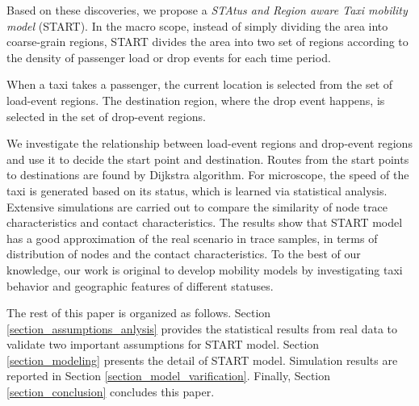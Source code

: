 Based on these discoveries, we propose a \emph{STAtus and Region aware Taxi mobility model} (START). In the macro scope, instead of simply dividing the area into coarse-grain regions, START divides the area into two set of regions according to the density of passenger load or drop events for each time period.


When a taxi takes a passenger, the current location is selected from the set of load-event regions. The destination region, where the drop event happens, is selected in the set of drop-event regions.



We investigate the relationship between load-event regions and drop-event regions and use it to decide the start point and destination. Routes from the start points to destinations are found by Dijkstra algorithm. For microscope, the speed of the taxi is generated based on its status, which is learned via statistical analysis. Extensive simulations are carried out to compare the similarity of node trace characteristics and contact characteristics. The results show that START model has a good approximation of the real scenario in trace samples, in terms of distribution of nodes and the contact characteristics. To the best of our knowledge, our work is original to develop mobility models by investigating taxi behavior and geographic features of different statuses.

The rest of this paper is organized as follows. Section \ref{section_assumptions_anlysis} provides the statistical results from real data to validate two important assumptions for START model. Section \ref{section_modeling} presents the detail of START model. Simulation results are reported in Section \ref{section_model_varification}. Finally, Section \ref{section_conclusion} concludes this paper.


